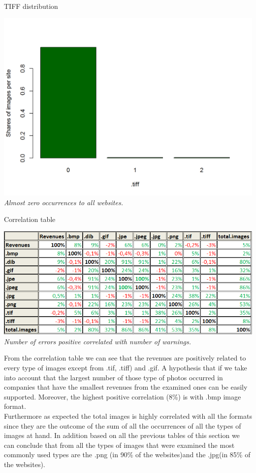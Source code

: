 \documentclass{book}
\begin{document}
\begin{table}[H]
\centering
\caption{TIFF distribution}
\begin{center}
\includegraphics[scale=0.4]{../R/photos/62_tiff_dist.png}    \\
\textit{Almost zero occurrences to all websites.}
\end{center}
\end{table}
\begin{table}[H]
\centering
\caption{Correlation table}
\begin{center}
\includegraphics[scale=0.55]{../R/photos/63b_img_cor.png}    \\
\textit{Number of errors positive correlated with number of warnings.}
\end{center}
\end{table}
From the correlation table we can see that the revenues are positively related to every type of images except from .tif, .tiff) and .gif. A hypothesis that if we take into account that the largest number of those type of photos occurred in companies that have the smallest revenues from the examined ones can be easily supported. Moreover, the highest positive correlation (8\%) is with .bmp image format. \\
Furthermore as expected the total images is highly correlated with all the formats since they are the outcome of the sum of all the occurrences of all the types of images at hand. In addition based on all the previous tables of this section we can conclude that from all the types of images that were examined the most commonly used types are the .png (in 90\% of the websites)and the .jpg(in 85\% of the websites).
\end{document}
